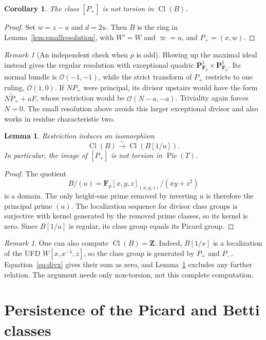 \documentclass[11pt,a4paper]{article}
\newtheorem{lemma}[theorem]{Lemma}
\newtheorem{corollary}[theorem]{Corollary}
\theoremstyle{remark}
\newtheorem{remark}[theorem]{Remark}
\newcommand{\Z}{\mathbf Z}
\newcommand{\F}{\mathbf F}
\newcommand{\PP}{\mathbf P}
\newcommand{\OO}{\mathcal O}
\newcommand{\Pic}{\operatorname{Pic}}
\newcommand{\Cl}{\operatorname{Cl}}
\begin{document}
\begin{corollary}\label{lem:clnonzero}
The class $[P_+]$ is not torsion in $\Cl(B)$.
\end{corollary}
\begin{proof}
Set $w=z-u$ and $d=2u$. Then $B$ is the ring in Lemma~\ref{lem:smallresolution}, with $W'=W$ and $\varpi=u$, and $P_+=(x,w)$.
\end{proof}

\begin{remark}[An independent check when $p$ is odd]
Blowing up the maximal ideal instead gives the regular resolution with exceptional quadric $\PP^1_{\F_p}\times\PP^1_{\F_p}$. Its normal bundle is $\OO(-1,-1)$, while the strict transform of $P_+$ restricts to one ruling, $\OO(1,0)$. If $NP_+$ were principal, its divisor upstairs would have the form $N\widetilde P_++aF$, whose restriction would be $\OO(N-a,-a)$. Triviality again forces $N=0$. The small resolution above avoids this larger exceptional divisor and also works in residue characteristic two.
\end{remark}

\begin{lemma}\label{lem:invertu}
Restriction induces an isomorphism
\[
\Cl(B)\xrightarrow{\sim}\Cl(B[1/u]).
\]
In particular, the image of $[P_+]$ is not torsion in $\Pic(T)$.
\end{lemma}
\begin{proof}
The quotient
\[
B/(u)=\F_p[x,y,z]_{(x,y,z)}/(xy+z^2)
\]
is a domain. The only height-one prime removed by inverting $u$ is therefore the principal prime $(u)$. The localization sequence for divisor class groups is surjective with kernel generated by the removed prime classes, so its kernel is zero. Since $B[1/u]$ is regular, its class group equals its Picard group.
\end{proof}

\begin{remark}
One can also compute $\Cl(B)=\Z$. Indeed, $B[1/x]$ is a localization of the UFD $W[x,x^{-1},z]$, so the class group is generated by $P_+$ and $P_-$. Equation~\eqref{eq:divx} gives their sum as zero, and Lemma~\ref{lem:clnonzero} excludes any further relation. The argument needs only non-torsion, not this complete computation.
\end{remark}

\section{Persistence of the Picard and Betti classes}
\end{document}
